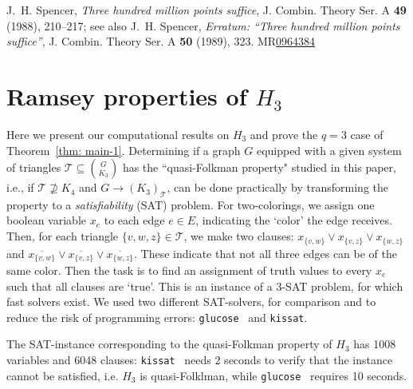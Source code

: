 \documentclass[A4paper,reqno,oneside,12pt]{amsart}
\theoremstyle{plain}
\theoremstyle{definition}
\newcommand{\scT}{\mathscr{T}}
\newcommand{\kissat}{\texttt{kissat}}
\newcommand{\glucose}{\texttt{glucose}}
\begin{document}
\begin{thebibliography}{}

J.~H. Spencer, 
{\it Three hundred million points suffice},
J. Combin. Theory Ser. A {\bf 49} (1988), 210--217;
see also J.~H. Spencer, 
{\it Erratum: ``Three hundred million points suffice''},
J. Combin. Theory Ser. A {\bf 50} (1989), 323.
MR\href{https://mathscinet.ams.org/mathscinet/article?mr=0964384}{0964384}


\end{thebibliography}

\appendix
\section{Ramsey properties of $H_3$}
\label{section: appendix}

Here we present our computational results on $H_3$ and prove the $q=3$ case of Theorem~\ref{thm: main-1}.
%
Determining if a graph $G$ equipped with a given system of triangles $\scT  \subseteq \binom{G}{K_3}$ has the ``quasi-Folkman property" studied in this paper, i.e., if $\scT\nsupseteq K_4$ and $G \longrightarrow (K_3)_\scT$, can be done practically by transforming the property to a \textit{satisfiability} (SAT) problem.
For two-colorings, we assign one boolean variable $x_e$ to each edge $e\in E$, indicating the `color' the edge receives.
Then, for each triangle $\{v,w,z\}\in\scT$, we make two clauses: \( x_{\{v,w\}}\lor x_{\{v,z\}} \lor x_{\{w,z\}} \) and \( \overline{x_{\{v,w\}}}\lor \overline{x_{\{v,z\}}} \lor \overline{x_{\{w,z\}}} \). These indicate that not all three edges can be of the same color.
Then the task is to find an assignment of truth values to every $x_e$ such that all clauses are `true'. This is an instance of a 3-SAT problem, for which fast solvers exist.
We used two different SAT-solvers, for comparison and to reduce the risk of programming errors: \glucose~ and \kissat.

The SAT-instance corresponding to the quasi-Folkman property of $H_3$ has 1008 variables and 6048 clauses: \kissat~ needs 2 seconds to verify that the instance cannot be satisfied, i.e. $H_3$ is quasi-Folklman, while \glucose~ requires 10 seconds.  %
\end{document}
